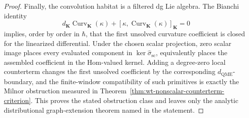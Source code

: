 \begin{proof}
  Finally, the convolution habitat is a filtered dg Lie algebra.  The
  Bianchi identity
  \[
    d_{\mathbf K}\operatorname{Curv}_{\mathbf K}(\kappa)
      +[\kappa,\operatorname{Curv}_{\mathbf K}(\kappa)]_{\mathbf K}=0
  \]
  implies, order by order in \(\hbar\), that the first unsolved curvature
  coefficient is closed for the linearized differential.  Under the chosen
  scalar projection, zero scalar image places every evaluated component in
  \(\ker\widehat\sigma_{\mathrm{sc}}\), equivalently places the assembled
  coefficient in the Hom-valued kernel.  Adding a degree-zero local
  counterterm changes the first unsolved coefficient by the corresponding
  \(d_{\mathrm{QME}}\)-boundary, and the finite-window compatibility of
  such primitives is exactly the Milnor obstruction measured in
  Theorem~\ref{thm:wt-nonscalar-counterterm-criterion}.  This proves the
  stated obstruction class and leaves only the analytic distributional
  graph-extension theorem named in the statement.
\end{proof}

